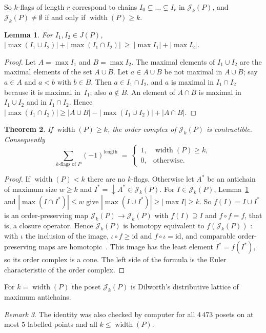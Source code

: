 \documentclass[11pt]{article}
\newtheorem{theorem}{Theorem}
\newtheorem{lemma}[theorem]{Lemma}
\theoremstyle{definition}
\theoremstyle{remark}
\newtheorem{remark}[theorem]{Remark}
\newcommand{\dn}{{\downarrow}}
\newcommand{\cJ}{\mathcal{J}}
\DeclareMathOperator{\width}{width}
\begin{document}
So $k$-flags of length $r$ correspond to chains $I_0\subsetneq\dots\subsetneq I_r$ in
$\cJ_k(P)$, and $\cJ_k(P)\ne\emptyset$ if and only if $\width(P)\ge k$.

\begin{lemma}\label{lem:submod}
For $I_1,I_2\in J(P)$,
$|\max(I_1\cup I_2)|+|\max(I_1\cap I_2)|\ \ge\ |\max I_1|+|\max I_2|$.
\end{lemma}
\begin{proof}
Let $A=\max I_1$ and $B=\max I_2$. The maximal elements of $I_1\cup I_2$ are the maximal
elements of the set $A\cup B$. Let $a\in A\cup B$ be not maximal in $A\cup B$; say $a\in A$
and $a<b$ with $b\in B$. Then $a\in I_1\cap I_2$, and $a$ is maximal in $I_1\cap I_2$
because it is maximal in~$I_1$; also $a\notin B$. An element of $A\cap B$ is maximal in
$I_1\cup I_2$ and in $I_1\cap I_2$. Hence
$|\max(I_1\cap I_2)|\ge |A\cup B|-|\max(I_1\cup I_2)|+|A\cap B|$.
\end{proof}

\begin{theorem}\label{thm:euler}
If $\width(P)\ge k$, the order complex of $\cJ_k(P)$ is contractible. Consequently
\[
  \sum_{\text{$k$-flags of $P$}} (-1)^{\text{length}}
  \;=\;\begin{cases}1,&\width(P)\ge k,\\ 0,&\text{otherwise.}\end{cases}
\]
\end{theorem}
\begin{proof}
If $\width(P)<k$ there are no $k$-flags. Otherwise let $A^*$ be an antichain of maximum
size $w\ge k$ and $I^*=\dn A^*\in\cJ_k(P)$. For $I\in\cJ_k(P)$, Lemma~\ref{lem:submod} and
$|\max(I\cap I^*)|\le w$ give $|\max(I\cup I^*)|\ge|\max I|\ge k$. So $f(I)=I\cup I^*$ is an
order-preserving map $\cJ_k(P)\to\cJ_k(P)$ with $f(I)\supseteq I$ and $f\circ f=f$, that
is, a closure operator. Hence $\cJ_k(P)$ is homotopy equivalent to $f(\cJ_k(P))$
\cite[Cor.~10.12]{B}: with $\iota$ the inclusion of the image, $\iota\circ f\ge\mathrm{id}$
and $f\circ\iota=\mathrm{id}$, and comparable order-preserving maps are
homotopic~\cite[1.3]{Q}. This image has the least element $I^*=f(I^*)$, so its order complex is a
cone. The left side of the formula is the Euler characteristic of the order complex.
\end{proof}

For $k=\width(P)$ the poset $\cJ_k(P)$ is Dilworth's distributive lattice of maximum
antichains.

\begin{remark}
The identity was also checked by computer for all $4\,473$ posets on at most $5$ labelled
points and all $k\le\width(P)$.
\end{remark}
\end{document}
